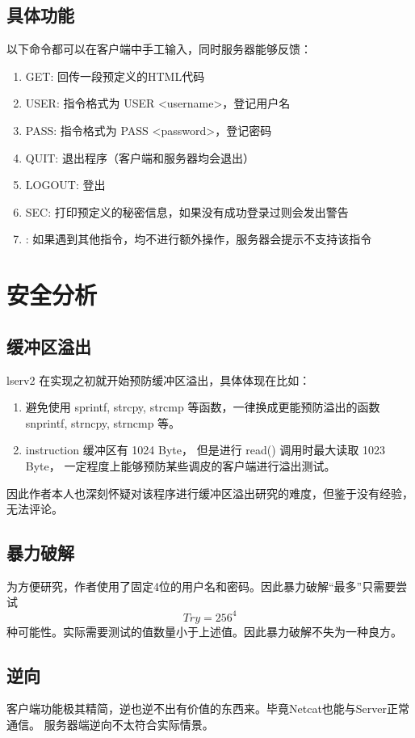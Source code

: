 \documentclass[a4paper,12pt]{article}
\begin{document}
\begin{CJK}{UTF8}{gbsn}
	\subsection{具体功能}
		以下命令都可以在客户端中手工输入，同时服务器能够反馈：
		\begin{enumerate}
		\item GET: 回传一段预定义的HTML代码
		\item USER: 指令格式为 USER <username>，登记用户名
		\item PASS: 指令格式为 PASS <password>，登记密码
		\item QUIT: 退出程序（客户端和服务器均会退出）
		\item LOGOUT: 登出
		\item SEC: 打印预定义的秘密信息，如果没有成功登录过则会发出警告
		\item \*: 如果遇到其他指令，均不进行额外操作，服务器会提示不支持该指令
		\end{enumerate}

\section{安全分析}
	\subsection{缓冲区溢出}
		lserv2 在实现之初就开始预防缓冲区溢出，具体体现在比如：
		\begin{enumerate}
		\item 避免使用 sprintf, strcpy, strcmp 等函数，一律换成更能预防溢出的函数 snprintf, strncpy, strncmp 等。
		\item instruction 缓冲区有 1024 Byte， 但是进行 read() 调用时最大读取 1023 Byte， 一定程度上能够预防某些调皮的客户端进行溢出测试。
		\end{enumerate}
		因此作者本人也深刻怀疑对该程序进行缓冲区溢出研究的难度，但鉴于没有经验，无法评论。
	\subsection{暴力破解}
		为方便研究，作者使用了固定4位的用户名和密码。因此暴力破解“最多”只需要尝试
		\begin{equation}
Try = 256^{4}
		\end{equation}
		种可能性。实际需要测试的值数量小于上述值。因此暴力破解不失为一种良方。
	\subsection{逆向}
		客户端功能极其精简，逆也逆不出有价值的东西来。毕竟Netcat也能与Server正常通信。
		服务器端逆向不太符合实际情景。

\end{CJK}
\end{document}
